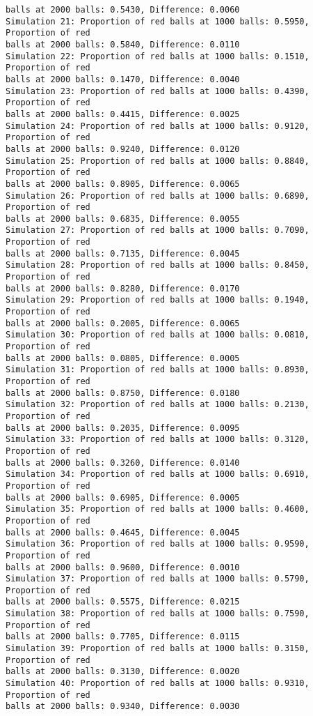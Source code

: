 \documentclass[11pt]{article}
\begin{document}
\begin{Verbatim}[commandchars=\\\{\}]
balls at 2000 balls: 0.5430, Difference: 0.0060
Simulation 21: Proportion of red balls at 1000 balls: 0.5950, Proportion of red
balls at 2000 balls: 0.5840, Difference: 0.0110
Simulation 22: Proportion of red balls at 1000 balls: 0.1510, Proportion of red
balls at 2000 balls: 0.1470, Difference: 0.0040
Simulation 23: Proportion of red balls at 1000 balls: 0.4390, Proportion of red
balls at 2000 balls: 0.4415, Difference: 0.0025
Simulation 24: Proportion of red balls at 1000 balls: 0.9120, Proportion of red
balls at 2000 balls: 0.9240, Difference: 0.0120
Simulation 25: Proportion of red balls at 1000 balls: 0.8840, Proportion of red
balls at 2000 balls: 0.8905, Difference: 0.0065
Simulation 26: Proportion of red balls at 1000 balls: 0.6890, Proportion of red
balls at 2000 balls: 0.6835, Difference: 0.0055
Simulation 27: Proportion of red balls at 1000 balls: 0.7090, Proportion of red
balls at 2000 balls: 0.7135, Difference: 0.0045
Simulation 28: Proportion of red balls at 1000 balls: 0.8450, Proportion of red
balls at 2000 balls: 0.8280, Difference: 0.0170
Simulation 29: Proportion of red balls at 1000 balls: 0.1940, Proportion of red
balls at 2000 balls: 0.2005, Difference: 0.0065
Simulation 30: Proportion of red balls at 1000 balls: 0.0810, Proportion of red
balls at 2000 balls: 0.0805, Difference: 0.0005
Simulation 31: Proportion of red balls at 1000 balls: 0.8930, Proportion of red
balls at 2000 balls: 0.8750, Difference: 0.0180
Simulation 32: Proportion of red balls at 1000 balls: 0.2130, Proportion of red
balls at 2000 balls: 0.2035, Difference: 0.0095
Simulation 33: Proportion of red balls at 1000 balls: 0.3120, Proportion of red
balls at 2000 balls: 0.3260, Difference: 0.0140
Simulation 34: Proportion of red balls at 1000 balls: 0.6910, Proportion of red
balls at 2000 balls: 0.6905, Difference: 0.0005
Simulation 35: Proportion of red balls at 1000 balls: 0.4600, Proportion of red
balls at 2000 balls: 0.4645, Difference: 0.0045
Simulation 36: Proportion of red balls at 1000 balls: 0.9590, Proportion of red
balls at 2000 balls: 0.9600, Difference: 0.0010
Simulation 37: Proportion of red balls at 1000 balls: 0.5790, Proportion of red
balls at 2000 balls: 0.5575, Difference: 0.0215
Simulation 38: Proportion of red balls at 1000 balls: 0.7590, Proportion of red
balls at 2000 balls: 0.7705, Difference: 0.0115
Simulation 39: Proportion of red balls at 1000 balls: 0.3150, Proportion of red
balls at 2000 balls: 0.3130, Difference: 0.0020
Simulation 40: Proportion of red balls at 1000 balls: 0.9310, Proportion of red
balls at 2000 balls: 0.9340, Difference: 0.0030

\end{Verbatim}
\end{document}
